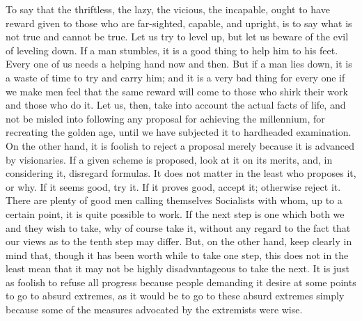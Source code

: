 \documentclass{scrbook}
\begin{document}
To say that the thriftless, the lazy, the vicious, the incapable, ought to have reward given
to those who are far-sighted, capable, and upright, is to say what is not true and cannot be
true. Let us try to level up, but let us beware of the evil of leveling down. If a man stumbles,
it is a good thing to help him to his feet. Every one of us needs a helping hand now and
then. But if a man lies down, it is a waste of time to try and carry him; and it is a very bad
thing for every one if we make men feel that the same reward will come to those who shirk
their work and those who do it. Let us, then, take into account the actual facts of life, and
not be misled into following any proposal for achieving the millennium, for recreating the
golden age, until we have subjected it to hardheaded examination. On the other hand, it is
foolish to reject a proposal merely because it is advanced by visionaries. If a given scheme
is proposed, look at it on its merits, and, in considering it, disregard formulas. It does not
matter in the least who proposes it, or why. If it seems good, try it. If it proves good,
accept it; otherwise reject it. There are plenty of good men calling themselves Socialists
with whom, up to a certain point, it is quite possible to work. If the next step is one which
both we and they wish to take, why of course take it, without any regard to the fact that
our views as to the tenth step may differ. But, on the other hand, keep clearly in mind that,
though it has been worth while to take one step, this does not in the least mean that it may
not be highly disadvantageous to take the next. It is just as foolish to refuse all progress
because people demanding it desire at some points to go to absurd extremes, as it would
be to go to these absurd extremes simply because some of the measures advocated by the
extremists were wise.
\end{document}
